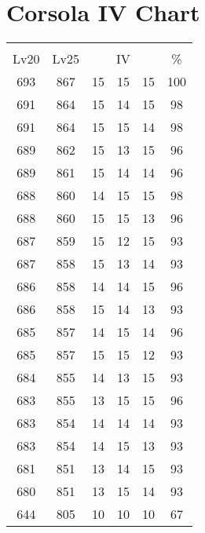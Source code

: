 \documentclass{article}%
\begin{document}
%
\normalsize%
\section{Corsola IV Chart}%
\label{sec:Corsola IV Chart}%
\renewcommand{\arraystretch}{1.5}%
\begin{tabular}{|c|c|c|c|c|c|}%
\hline%
\multicolumn{6}{|c|}{\textcolor{white}{ 
\linebreak{Corsola}
}%
\cellcolor{black}}\\%
\multicolumn{1}{|c}{Lv20}&\multicolumn{1}{c|}{Lv25}&\multicolumn{3}{c|}{IV}&\multicolumn{1}{|c|}{\%}\\%
\hline%
\rowcolor{color100}%
693&867&15&15&15&100\\%
\hline%
\rowcolor{color98}%
691&864&15&14&15&98\\%
\hline%
\rowcolor{color98}%
691&864&15&15&14&98\\%
\hline%
\rowcolor{color96}%
689&862&15&13&15&96\\%
\hline%
\rowcolor{color96}%
689&861&15&14&14&96\\%
\hline%
\rowcolor{color98}%
688&860&14&15&15&98\\%
\hline%
\rowcolor{color96}%
688&860&15&15&13&96\\%
\hline%
\rowcolor{color93}%
687&859&15&12&15&93\\%
\hline%
\rowcolor{color93}%
687&858&15&13&14&93\\%
\hline%
\rowcolor{color96}%
686&858&14&14&15&96\\%
\hline%
\rowcolor{color93}%
686&858&15&14&13&93\\%
\hline%
\rowcolor{color96}%
685&857&14&15&14&96\\%
\hline%
\rowcolor{color93}%
685&857&15&15&12&93\\%
\hline%
\rowcolor{color93}%
684&855&14&13&15&93\\%
\hline%
\rowcolor{color96}%
683&855&13&15&15&96\\%
\hline%
\rowcolor{color93}%
683&854&14&14&14&93\\%
\hline%
\rowcolor{color93}%
683&854&14&15&13&93\\%
\hline%
\rowcolor{color93}%
681&851&13&14&15&93\\%
\hline%
\rowcolor{color93}%
680&851&13&15&14&93\\%
\hline%
\rowcolor{color91}%
644&805&10&10&10&67\\%
\end{tabular}

%
\end{document}
